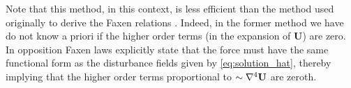 Note that this method, in this context, is less efficient than the method used originally to derive the Faxen relations \citet{kim2013microhydrodynamics}. 
Indeed, in the former method we have do not know a priori if the higher order terms (in the expansion of $\textbf{U}$) are zero.
In opposition Faxen laws explicitly state that the force must have the same functional form as the disturbance fields given by \ref{eq:solution_hat}, thereby implying that the higher order terms proportional to $\sim \mathbf{\nabla}^4 \textbf{U}$ are zeroth. 

